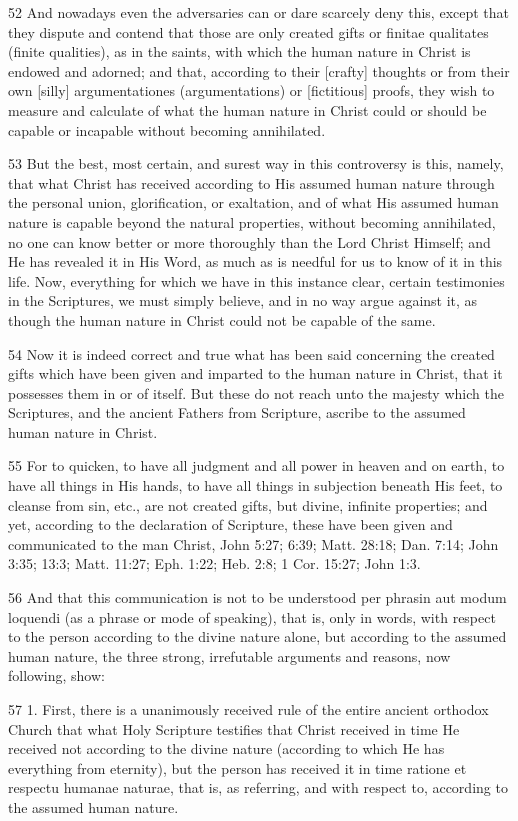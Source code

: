 {52 And nowadays even the adversaries can or dare scarcely deny this, except that they dispute and contend that those are only created gifts or finitae qualitates (finite qualities), as in the saints, with which the human nature in Christ is endowed and adorned; and that, according to their [crafty] thoughts or from their own [silly] argumentationes (argumentations) or [fictitious] proofs, they wish to measure and calculate of what the human nature in Christ could or should be capable or incapable without becoming annihilated.

53 But the best, most certain, and surest way in this controversy is this, namely, that what Christ has received according to His assumed human nature through the personal union, glorification, or exaltation, and of what His assumed human nature is capable beyond the natural properties, without becoming annihilated, no one can know better or more thoroughly than the Lord Christ Himself; and He has revealed it in His Word, as much as is needful for us to know of it in this life. Now, everything for which we have in this instance clear, certain testimonies in the Scriptures, we must simply believe, and in no way argue against it, as though the human nature in Christ could not be capable of the same.

54 Now it is indeed correct and true what has been said concerning the created gifts which have been given and imparted to the human nature in Christ, that it possesses them in or of itself. But these do not reach unto the majesty which the Scriptures, and the ancient Fathers from Scripture, ascribe to the assumed human nature in Christ.

55 For to quicken, to have all judgment and all power in heaven and on earth, to have all things in His hands, to have all things in subjection beneath His feet, to cleanse from sin, etc., are not created gifts, but divine, infinite properties; and yet, according to the declaration of Scripture, these have been given and communicated to the man Christ, John 5:27; 6:39; Matt. 28:18; Dan. 7:14; John 3:35; 13:3; Matt. 11:27; Eph. 1:22; Heb. 2:8; 1 Cor. 15:27; John 1:3.

56 And that this communication is not to be understood per phrasin aut modum loquendi (as a phrase or mode of speaking), that is, only in words, with respect to the person according to the divine nature alone, but according to the assumed human nature, the three strong, irrefutable arguments and reasons, now following, show:

57 1. First, there is a unanimously received rule of the entire ancient orthodox Church that what Holy Scripture testifies that Christ received in time He received not according to the divine nature (according to which He has everything from eternity), but the person has received it in time ratione et respectu humanae naturae, that is, as referring, and with respect to, according to the assumed human nature.

}
